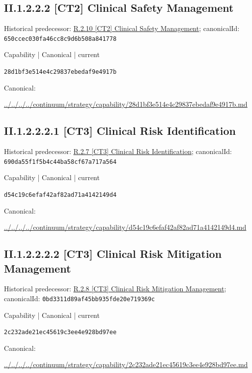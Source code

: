 \documentclass[10pt,a4paper]{article}
\begin{document}
\subsection*{II.1.2.2.2 [CT2] Clinical Safety Management}
Historical predecessor: \hyperref[element-650ccec030fa46cc8c9d6b508a841778]{R.2.10 [CT2] Clinical Safety Management}; canonicalId: \texttt{650ccec030fa46cc8c9d6b508a841778}\par
\label{element-28d1bf3e514e4c29837ebedaf9e4917b}
{\small Capability | Canonical | current}\par
\texttt{28d1bf3e514e4c29837ebedaf9e4917b}\par
Canonical: \par
{\footnotesize\url{../../../../continuum/strategy/capability/28d1bf3e514e4c29837ebedaf9e4917b.md}}\par
\subsection*{II.1.2.2.2.1 [CT3] Clinical Risk Identification}
Historical predecessor: \hyperref[element-690da55f1f5b4c44ba58cf67a717a564]{R.2.7 [CT3] Clinical Risk Identification}; canonicalId: \texttt{690da55f1f5b4c44ba58cf67a717a564}\par
\label{element-d54c19c6efaf42af82ad71a4142149d4}
{\small Capability | Canonical | current}\par
\texttt{d54c19c6efaf42af82ad71a4142149d4}\par
Canonical: \par
{\footnotesize\url{../../../../continuum/strategy/capability/d54c19c6efaf42af82ad71a4142149d4.md}}\par
\subsection*{II.1.2.2.2.2 [CT3] Clinical Risk Mitigation Management}
Historical predecessor: \hyperref[element-0bd3311d89af45bb935fde20e719369c]{R.2.8 [CT3] Clinical Risk Mitigation Management}; canonicalId: \texttt{0bd3311d89af45bb935fde20e719369c}\par
\label{element-2c232ade21ec45619c3ee4e928bd97ee}
{\small Capability | Canonical | current}\par
\texttt{2c232ade21ec45619c3ee4e928bd97ee}\par
Canonical: \par
{\footnotesize\url{../../../../continuum/strategy/capability/2c232ade21ec45619c3ee4e928bd97ee.md}}\par
\end{document}
